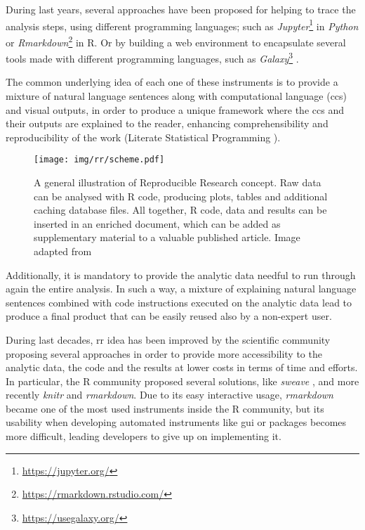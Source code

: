 During last years, several approaches \cite{russo2015advantages} have been proposed for helping to trace the analysis steps, using different programming languages; such as  \textit{Jupyter}\footnote{\url{https://jupyter.org/}} \cite{Kluyver2016} in \textit{Python} or \textit{Rmarkdown}\footnote{\url{https://rmarkdown.rstudio.com/}} in R.
Or by building a web environment to encapsulate several tools made with different programming languages, such as \textit{Galaxy}\footnote{\url{https://usegalaxy.org/}} \cite{Blankenberg2010, Giardine2005, Goecks2010}.

The common underlying idea of each one of these instruments is to provide a mixture of natural language sentences along with computational language (\glspl{cc}) and visual outputs, in order to produce a unique framework where the \glspl{cc} and their outputs are explained to the reader, enhancing comprehensibility and reproducibility of the work 
(Literate Statistical Programming \cite{Knuth1984a}).

\begin{figure}[ht]
\centering
\texttt{[image: img/rr/scheme.pdf]}
\caption[Reproducible Research illustration]{A general illustration of Reproducible Research concept. Raw data can be analysed with R code, producing plots, tables and additional caching database files. All together, R code, data and results can be inserted in an enriched document, which can be added as supplementary material to a valuable published article.\newline
Image adapted from \cite{RussoRighelli2016}}
\label{fig:rrscheme}
\end{figure}

Additionally, it is mandatory to provide the analytic data needful to run through again the entire analysis.
In such a way, a mixture of explaining natural language sentences combined with code instructions executed on the analytic data lead to produce a final product that can be easily reused also by a non-expert user.

During last decades, \gls{rr} idea has been improved by the scientific community proposing several approaches in order to provide more accessibility to the analytic data, the code and the results at lower costs in terms of time and efforts.
In particular, the R community proposed several solutions, like \textit{sweave} \cite{Leisch2002a, Leisch2002}, and more recently \textit{knitr} \cite{Xie2012} and \textit{rmarkdown}.
Due to its easy interactive usage, \textit{rmarkdown} became one of the most used instruments inside the R community, but its usability when developing automated instruments like \gls{gui} or packages becomes more difficult, leading developers to give up on implementing it.

